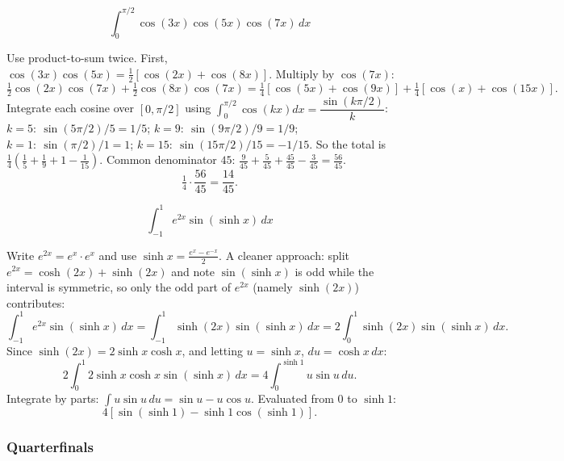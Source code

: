 \begin{questions}
\question
\[ \int_0^{\pi/2}\cos(3x)\cos(5x)\cos(7x)\,dx \]
\begin{solution}
Use product-to-sum twice. First, $\cos(3x)\cos(5x)=\tfrac12[\cos(2x)+\cos(8x)]$. Multiply by $\cos(7x)$:
\[ \tfrac12\cos(2x)\cos(7x)+\tfrac12\cos(8x)\cos(7x) = \tfrac14[\cos(5x)+\cos(9x)]+\tfrac14[\cos(x)+\cos(15x)]. \]
Integrate each cosine over $[0,\pi/2]$ using $\int_0^{\pi/2}\cos(kx)dx=\dfrac{\sin(k\pi/2)}{k}$:
$k=5:\ \sin(5\pi/2)/5=1/5$; $k=9:\ \sin(9\pi/2)/9=1/9$; $k=1:\ \sin(\pi/2)/1=1$; $k=15:\ \sin(15\pi/2)/15=-1/15$.
So the total is $\tfrac14\left(\tfrac15+\tfrac19+1-\tfrac{1}{15}\right)$. Common denominator $45$: $\tfrac{9}{45}+\tfrac{5}{45}+\tfrac{45}{45}-\tfrac{3}{45}=\tfrac{56}{45}$.
\[ \tfrac14\cdot\frac{56}{45}=\frac{14}{45}. \]
\end{solution}

\question
\[ \int_{-1}^{1} e^{2x}\sin(\sinh x)\,dx \]
\begin{solution}
Write $e^{2x}=e^x\cdot e^x$ and use $\sinh x=\tfrac{e^x-e^{-x}}2$. A cleaner approach: split $e^{2x}=\cosh(2x)+\sinh(2x)$ and note $\sin(\sinh x)$ is odd while the interval is symmetric, so only the odd part of $e^{2x}$ (namely $\sinh(2x)$) contributes:
\[ \int_{-1}^1 e^{2x}\sin(\sinh x)\,dx = \int_{-1}^1 \sinh(2x)\sin(\sinh x)\,dx = 2\int_0^1 \sinh(2x)\sin(\sinh x)\,dx. \]
Since $\sinh(2x)=2\sinh x\cosh x$, and letting $u=\sinh x$, $du=\cosh x\,dx$:
\[ 2\int_0^1 2\sinh x\cosh x\sin(\sinh x)\,dx = 4\int_0^{\sinh 1} u\sin u\,du. \]
Integrate by parts: $\int u\sin u\,du=\sin u - u\cos u$. Evaluated from $0$ to $\sinh1$:
\[ 4\left[\sin(\sinh1)-\sinh1\cos(\sinh1)\right]. \]
\end{solution}

\end{questions}

\subsubsection*{Quarterfinals}

